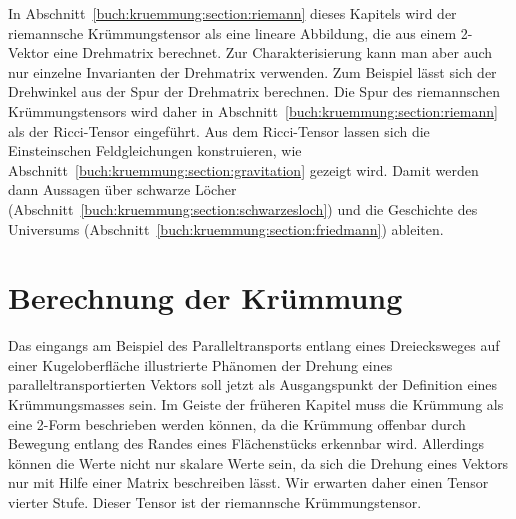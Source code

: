 In Abschnitt~\ref{buch:kruemmung:section:riemann} dieses Kapitels
wird der riemannsche Krümmungstensor als eine lineare Abbildung,
die aus einem 2-Vektor eine Drehmatrix berechnet.
Zur Charakterisierung kann man aber auch nur einzelne Invarianten
der Drehmatrix verwenden.
Zum Beispiel lässt sich der Drehwinkel aus der Spur der Drehmatrix
berechnen.
Die Spur des riemannschen Krümmungstensors wird daher in 
Abschnitt~\ref{buch:kruemmung:section:riemann} als der Ricci-Tensor
eingeführt.
Aus dem Ricci-Tensor lassen sich die Einsteinschen Feldgleichungen
konstruieren, wie Abschnitt~\ref{buch:kruemmung:section:gravitation}
gezeigt wird.
Damit werden dann Aussagen über schwarze Löcher
(Abschnitt~\ref{buch:kruemmung:section:schwarzesloch})
und die Geschichte des Universums
(Abschnitt~\ref{buch:kruemmung:section:friedmann})
ableiten.

%
%
\section{Berechnung der Krümmung
\label{buch:kruemmung:section:riemann}}
Das eingangs am Beispiel des Paralleltransports entlang eines
Dreiecksweges auf einer Kugeloberfläche illustrierte Phänomen
der Drehung eines paralleltransportierten Vektors soll jetzt
als Ausgangspunkt der Definition eines Krümmungsmasses sein.
Im Geiste der früheren Kapitel muss die Krümmung als eine 2-Form
beschrieben werden können, da die Krümmung offenbar durch Bewegung
entlang des Randes eines Flächenstücks erkennbar wird.
Allerdings können die Werte nicht nur skalare Werte sein, da
sich die Drehung eines Vektors nur mit Hilfe einer Matrix
beschreiben lässt.
Wir erwarten daher einen Tensor vierter Stufe.
Dieser Tensor ist der riemannsche Krümmungstensor.

%
%
